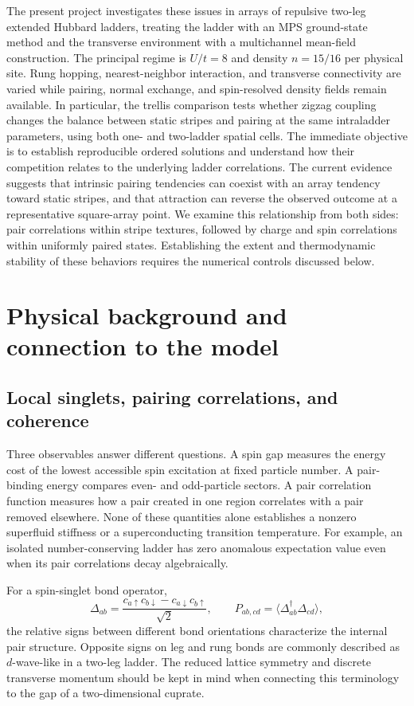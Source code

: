 \documentclass[11pt,letterpaper]{article}
\newcommand{\avg}[1]{\langle #1\rangle}
\begin{document}
The present project investigates these issues in arrays of repulsive two-leg
extended Hubbard ladders, treating the ladder with an MPS ground-state method
and the transverse environment with a multichannel mean-field construction.
The principal regime is $U/t=8$ and density $n=15/16$ per physical site.
Rung hopping, nearest-neighbor interaction, and transverse connectivity are
varied while pairing, normal exchange, and spin-resolved density fields remain
available. In particular, the trellis comparison tests whether zigzag
coupling changes the balance between static stripes and pairing at the same
intraladder parameters, using both one- and two-ladder spatial cells.
The immediate objective is to establish reproducible ordered
solutions and understand how their competition relates to the underlying
ladder correlations. The current evidence suggests that intrinsic pairing
tendencies can coexist with an array tendency toward static stripes, and that
attraction can reverse the observed outcome at a representative square-array
point. We examine this relationship from both sides: pair correlations
within stripe textures, followed by charge and spin correlations within
uniformly paired states. Establishing the extent and thermodynamic stability of these behaviors
requires the numerical controls discussed below.

\section{Physical background and connection to the model}
\label{sec:background}

\subsection{Local singlets, pairing correlations, and coherence}

Three observables answer different questions. A spin gap measures the energy
cost of the lowest accessible spin excitation at fixed particle number.
A pair-binding energy compares even- and odd-particle sectors. A pair
correlation function measures how a pair created in one region correlates with
a pair removed elsewhere. None of these quantities alone establishes a
nonzero superfluid stiffness or a superconducting transition temperature.
For example, an isolated number-conserving ladder has zero anomalous
expectation value even when its pair correlations decay algebraically.

For a spin-singlet bond operator,
\begin{equation}
 \Delta_{ab}=\frac{c_{a\uparrow}c_{b\downarrow}
                   -c_{a\downarrow}c_{b\uparrow}}{\sqrt{2}},
 \qquad
 P_{ab,cd}=\avg{\Delta^\dagger_{ab}\Delta_{cd}},
 \label{eq:pair-op}
\end{equation}
the relative signs between different bond orientations characterize the
internal pair structure. Opposite signs on leg and rung bonds are commonly
described as $d$-wave-like in a two-leg ladder. The reduced lattice symmetry
and discrete transverse momentum should be kept in mind when connecting this
terminology to the gap of a two-dimensional cuprate.
\end{document}
